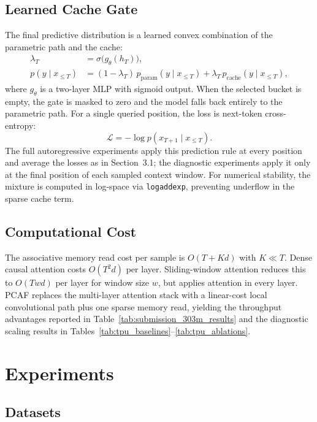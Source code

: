 \documentclass{article}
\begin{document}
\subsection{Learned Cache Gate}

The final predictive distribution is a learned convex combination of the
parametric path and the cache:
\begin{align}
  \lambda_T &= \sigma\bigl(g_{\theta}(h_T)\bigr), \\
  p(y \mid x_{\leq T}) &=
  (1 - \lambda_T)\,p_{\mathrm{param}}(y \mid x_{\leq T})
  + \lambda_T\,p_{\mathrm{cache}}(y \mid x_{\leq T}),
  \label{eq:mixture}
\end{align}
where $g_\theta$ is a two-layer MLP with sigmoid output. When the selected
bucket is empty, the gate is masked to zero and the model falls back entirely
to the parametric path. For a single queried position, the loss is next-token
cross-entropy:
\begin{equation}
  \mathcal{L} = -\log p(x_{T+1} \mid x_{\leq T}).
\end{equation}
The full autoregressive experiments apply this prediction rule at every
position and average the losses as in Section~3.1; the diagnostic experiments
apply it only at the final position of each sampled context window.
For numerical stability, the mixture is computed in log-space via
\texttt{logaddexp}, preventing underflow in the sparse cache term.

\subsection{Computational Cost}

The associative memory read cost per sample is $O(T + Kd)$ with $K \ll T$.
Dense causal attention costs $O(T^2 d)$ per layer. Sliding-window attention
reduces this to $O(Twd)$ per layer for window size $w$, but applies attention
in every layer. PCAF replaces the multi-layer attention stack with a
linear-cost local convolutional path plus one sparse memory read, yielding the throughput
advantages reported in Table~\ref{tab:submission_303m_results} and the
diagnostic scaling results in Tables~\ref{tab:tpu_baselines}--\ref{tab:tpu_ablations}.

\section{Experiments}

\subsection{Datasets}
\end{document}
